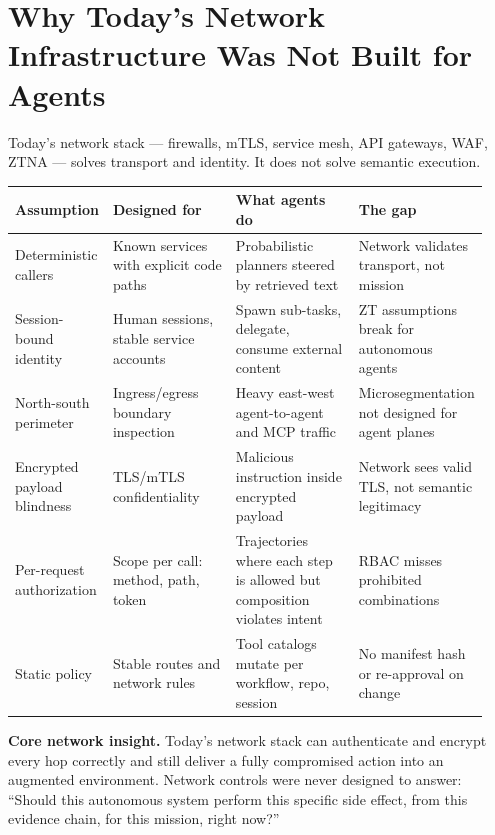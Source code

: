\documentclass[10pt]{article}
\begin{document}
\section{Why Today's Network Infrastructure Was Not Built for Agents}
Today's network stack --- firewalls, mTLS, service mesh, API gateways, WAF, ZTNA --- solves transport and identity. It does not solve semantic execution.

\begin{longtable}{@{}p{0.18\linewidth}p{0.26\linewidth}p{0.26\linewidth}p{0.24\linewidth}@{}}
\toprule
\textbf{Assumption} & \textbf{Designed for} & \textbf{What agents do} & \textbf{The gap} \\
\midrule
\endhead
Deterministic callers & Known services with explicit code paths & Probabilistic planners steered by retrieved text & Network validates transport, not mission \\
Session-bound identity & Human sessions, stable service accounts & Spawn sub-tasks, delegate, consume external content & ZT assumptions break for autonomous agents \\
North-south perimeter & Ingress/egress boundary inspection & Heavy east-west agent-to-agent and MCP traffic & Microsegmentation not designed for agent planes \\
Encrypted payload blindness & TLS/mTLS confidentiality & Malicious instruction inside encrypted payload & Network sees valid TLS, not semantic legitimacy \\
Per-request authorization & Scope per call: method, path, token & Trajectories where each step is allowed but composition violates intent & RBAC misses prohibited combinations \\
Static policy & Stable routes and network rules & Tool catalogs mutate per workflow, repo, session & No manifest hash or re-approval on change \\
\bottomrule
\end{longtable}

\noindent\colorbox{infobg}{\parbox{\dimexpr\linewidth-2\fboxsep\relax}{%
\textbf{Core network insight.} Today's network stack can authenticate and encrypt every hop correctly and still deliver a fully compromised action into an augmented environment. Network controls were never designed to answer: ``Should this autonomous system perform this specific side effect, from this evidence chain, for this mission, right now?''}}
\end{document}
